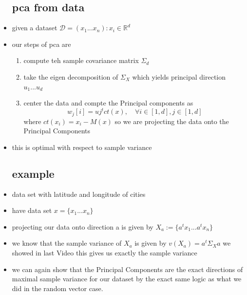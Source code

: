 \documentclass{article}
\begin{document}
\begin{itemize}
\subsection*{pca from data}
\item given a dataset $\mathcal{D}=(x_1...x_n) : x_i\in \mathbb{R}^{d}$
\item our steps of pca are 
\begin{enumerate}
    \item compute teh sample covariance matrix $\Sigma_{d}$
    \item take the eigen decomposition of $\Sigma_{X}$ which yields principal direction $u_1...u_d$
    \item center the data and compte the Principal components as $$w_j[i]=uj^{t}ct(x), \quad \forall i\in [1,d], j\in [1,d]$$ where $ct(x_i)=x_i-M(x)$ so we are projecting the data onto the Principal Components
\end{enumerate}
\item this is optimal with respect to sample variance
\subsection*{example}
\item data set with latitude and longitude of cities 
\item have data set $x=\{x_1...x_n\}$
\item projecting our data onto direction a  is given by $X_{a}:=\{a^tx_1...a^tx_n\}$
\item we know that the sample variance of $X_a$ is given by $v(X_a)=a^t\Sigma_X a$ we showed in last Video this gives us exactly the sample variance
\item we can again show that the Principal Components are the exact directions of maximal sample variance for our dataset by the exact same logic as what we did in the random vector case. 

\end{itemize}
\end{document}

